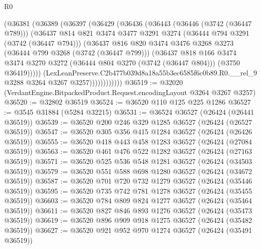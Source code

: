 \begin{lexlean}{R0}
\begin{coremodule}
                (@36381
                  (@36389
                    (@36397
                      (@36429
                        (@36436
                          (@36443
                            (@36446 (@3742 (@36447 @789)))
                            (@36437
                              @814
                              @821
                              @3474
                              @3477
                              @3291
                              @3274
                              (@36444 @794 @3291 (@3742 (@36447 @794)))
                              (@36437
                                @816
                                @820
                                @3474
                                @3476
                                @3268
                                @3273
                                (@36444 @799 @3268 (@3742 (@36447 @799)))
                                (@36437
                                  @818
                                  @166
                                  @3474
                                  @3474
                                  @3270
                                  @3272
                                  (@36444 @804 @3270 (@3742 (@36447 @804)))
                                  (@3750 @36419)))))
                          (LexLeanPreserve.C2b477b039d8a18a55b3ec6585f6c0b89.R0.__rel_9
                            @3288
                            @3264
                            @3267
                            @3257))))))))))))
@36519 := @32020 (VerdantEngine.BitpackedProduct.Request.encodingLayout @3264 @3267 @3257)
@36520 := @32802 @36519
@36524 := @36520 @110 @125 @225 @1286
@36527 := @3545 @31884 (@5284 @32215)
@36531 := @36524 @36527 (@26424 (@26441 @36519))
@36539 := @36520 @200 @246 @329 @1285 @36527 (@26424 (@26527 @36519))
@36547 := @36520 @305 @356 @415 @1284 @36527 (@26424 (@26426 @36519))
@36555 := @36520 @418 @443 @458 @1283 @36527 (@26424 (@27084 @36519))
@36563 := @36520 @461 @476 @522 @1282 @36527 (@26424 (@27163 @36519))
@36571 := @36520 @525 @536 @548 @1281 @36527 (@26424 (@34503 @36519))
@36579 := @36520 @551 @588 @698 @1280 @36527 (@26424 (@34672 @36519))
@36587 := @36520 @701 @720 @732 @1279 @36527 (@26424 (@35446 @36519))
@36595 := @36520 @735 @742 @781 @1278 @36527 (@26424 (@35455 @36519))
@36603 := @36520 @784 @809 @824 @1277 @36527 (@26424 (@35464 @36519))
@36611 := @36520 @827 @846 @893 @1276 @36527 (@26424 (@35473 @36519))
@36619 := @36520 @896 @909 @918 @1275 @36527 (@26424 (@35482 @36519))
@36627 := @36520 @921 @952 @970 @1274 @36527 (@26424 (@35491 @36519))

\end{coremodule}
\end{lexlean}
